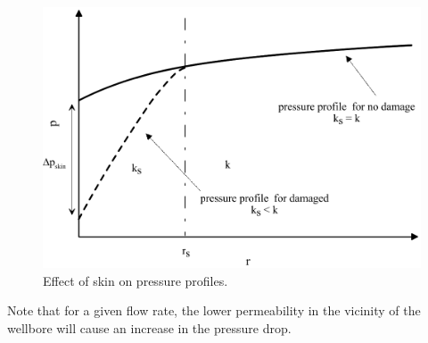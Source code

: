 \documentclass{llncs}
\numberwithin{equation}{section}
\numberwithin{figure}{section}
\numberwithin{table}{section}
\begin{document}
    \begin{figure}
        \begin{center}
        \includegraphics[scale=0.6]{Skin_effect_2.pdf}
        \end{center}
        \caption{Effect of skin on pressure profiles.}
        \label{Skin_effect_2}
    \end{figure}       
    
    Note that for a given flow rate, the lower permeability in the vicinity of the wellbore will cause an increase in the pressure drop.
    
    
    
    
    
    
    
    
    

    
    
%
\end{document}
